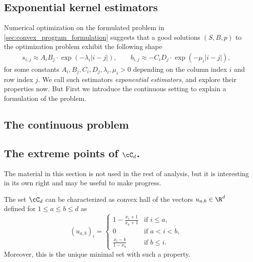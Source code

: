\subsection{Exponential kernel estimators}
Numerical optimization on the formulated problem in \cref{sec:convex_program_formulation}
suggests that a good solutions $(S,B,p)$ to the optimization problem exhibit the following shape
\begin{align*}
    s_{i,j} \approx A_i B_j \cdot \exp(-\lambda_i |i-j|),
    \qquad
    b_{i,j} \approx - C_i D_j \cdot \exp(-\mu_i |i-j|),
\end{align*}
for some constants $A_i, B_j, C_i, D_j, \lambda_i,\mu_i>0$ depending on the column index $i$ and row index $j$.
We call such estimators \emph{exponential estimators}, and explore their properties now.
But First we introduce the continuous setting to explain a formulation of the problem.

\subsection{The continuous problem}




\subsection{The extreme points of $\cC_d$.}
The material in this section is not used in the rest of analysis, but it is interesting in its own right and may be useful to make progress.
\begin{theorem}
    The set $\cC_d$ can be characterized as convex hall of the vectors $u_{a,b} \in \R^d$ defined for $1\leq a \leq b \leq d$ as
    \[
        (u_{a,b})_i = \begin{cases}
            1 - \frac{x_i + 1}{x_a + 1} & \text{if } i \leq a,  \\
            0                           & \text{if } a < i < b, \\
            \frac{x_i - b}{1 - x_b}     & \text{if } b \leq i.
        \end{cases}
    \]
    Moreover, this is the unique minimal set with such a property.
\end{theorem}

